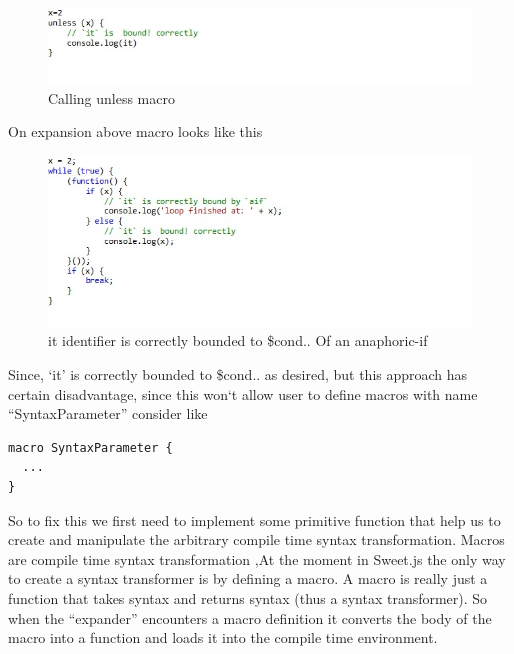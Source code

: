\begin{figure}[htb]
\centering
\includegraphics[width=1.0\textwidth]{images/Appraoch2.jpg}
\caption{Calling unless macro} 
\label{fig:AST}

\end{figure}

On expansion above macro looks like this

\begin{figure}[htb]
\centering
\includegraphics[width=1.0\textwidth]{images/Appraoch3.jpg}
\caption{ it identifier is correctly bounded to \$cond.. Of an anaphoric-if} 
\label{fig:AST}

\end{figure}

Since, `it' is correctly bounded to \$cond.. as desired, but this approach has certain disadvantage, since this won`t allow user to define macros with name ``SyntaxParameter'' consider like

\begin{lstlisting}[frame=single]
macro SyntaxParameter {
  ...
}
\end{lstlisting}

So to fix this we first need to implement some primitive function that help us to create and manipulate the arbitrary compile time syntax transformation. Macros are compile time syntax transformation ,At the moment in Sweet.js the only way to create a syntax transformer is by defining a macro. A macro is really just a function that takes syntax and returns syntax (thus a syntax transformer). So when the ``expander'' encounters a macro definition it converts the body of the macro into a function and loads it into the compile time environment.

